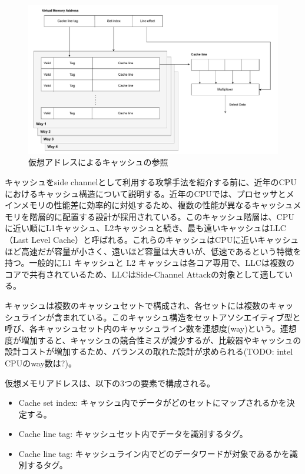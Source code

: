 \begin{figure}[tb]
  \centering
  \includegraphics[width=\linewidth]{img/cache.drawio.pdf}
  \caption{仮想アドレスによるキャッシュの参照}\label{fig:cache-overview}
\end{figure}


キャッシュをside channelとして利用する攻撃手法を紹介する前に、近年のCPUにおけるキャッシュ構造について説明する。近年のCPUでは、プロセッサとメインメモリの性能差に効率的に対処するため、複数の性能が異なるキャッシュメモリを階層的に配置する設計が採用されている。このキャッシュ階層は、CPUに近い順にL1キャッシュ、L2キャッシュと続き、最も遠いキャッシュはLLC（Last Level Cache）と呼ばれる。これらのキャッシュはCPUに近いキャッシュほど高速だが容量が小さく、遠いほど容量は大きいが、低速であるという特徴を持つ。一般的にL1 キャッシュと L2 キャッシュは各コア専用で、LLCは複数のコアで共有されているため、LLCはSide-Channel Attackの対象として適している。\par

キャッシュは複数のキャッシュセットで構成され、各セットには複数のキャッシュラインが含まれている。このキャッシュ構造をセットアソシエイティブ型と呼び、各キャッシュセット内のキャッシュライン数を連想度(way)という。連想度が増加すると、キャッシュの競合性ミスが減少するが、比較器やキャッシュの設計コストが増加するため、バランスの取れた設計が求められる{\color{red}(TODO: intel CPUのway数は?)}。\par


仮想メモリアドレスは、以下の3つの要素で構成される。
\begin{itemize}
  \item Cache set index: キャッシュ内でデータがどのセットにマップされるかを決定する。
  \item Cache line tag: キャッシュセット内でデータを識別するタグ。
  \item Cache line tag: キャッシュライン内でどのデータワードが対象であるかを識別するタグ。
\end{itemize}

